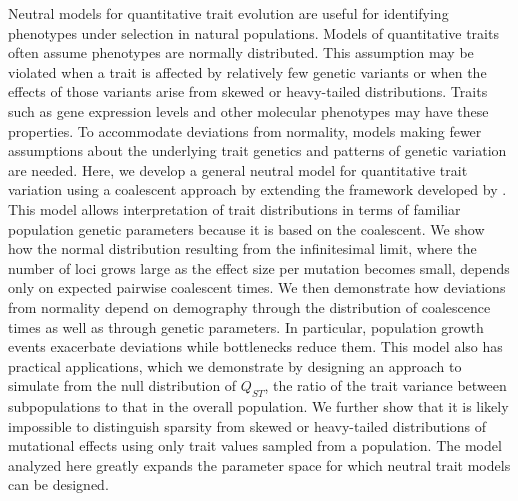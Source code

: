 Neutral models for quantitative trait evolution are useful for identifying
phenotypes under selection in natural populations. Models of quantitative traits
often assume phenotypes are normally distributed. This assumption may be
violated when a trait is affected by relatively few genetic variants or when the
effects of those variants arise from skewed or heavy-tailed distributions.
Traits such as gene expression levels and other molecular phenotypes may have
these properties. To accommodate deviations from normality, models making fewer
assumptions about the underlying trait genetics and patterns of genetic
variation are needed. Here, we develop a general neutral model for quantitative
trait variation using a coalescent approach by extending the framework developed
by \citet{Schraiber2015}. This model allows interpretation of trait
distributions in terms of familiar population genetic parameters because it is
based on the coalescent. We show how the normal distribution resulting from the
infinitesimal limit, where the number of loci grows large as the effect size per
mutation becomes small, depends only on expected pairwise coalescent times. We
then demonstrate how deviations from normality depend on demography through the
distribution of coalescence times as well as through genetic parameters. In
particular, population growth events exacerbate deviations while bottlenecks
reduce them. This model also has practical applications, which we demonstrate by
designing an approach to simulate from the null distribution of $Q_{ST}$, the
ratio of the trait variance between subpopulations to that in the overall
population. We further show that it is likely impossible to distinguish sparsity
from skewed or heavy-tailed distributions of mutational effects using only trait
values sampled from a population. The model analyzed here greatly expands the
parameter space for which neutral trait models can be designed.

